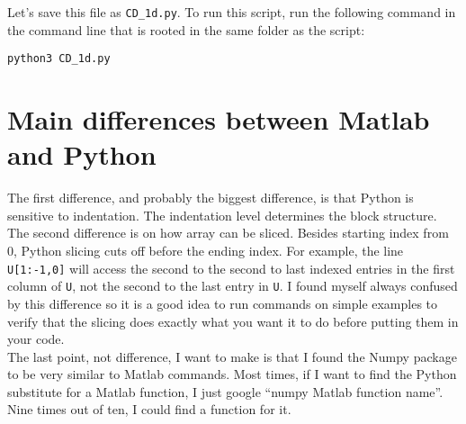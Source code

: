 \documentclass{article}
\begin{document}
Let's save this file as \texttt{CD\_1d.py}. To run this script, run the following command in the command line that is rooted in the same folder as the script:
\begin{center}
\texttt{python3 CD\_1d.py}
\end{center}

\section{Main differences between Matlab and Python}
The first difference, and probably the biggest difference, is that Python is sensitive to indentation. The indentation level determines the block structure. \\

The second difference is on how array can be sliced. Besides starting index from 0, Python slicing cuts off before the ending index. For example, the line \texttt{U[1:-1,0]} will access the second to the second to last indexed entries in the first column of \texttt{U}, not the second to the last entry in \texttt{U}. I found myself always confused by this difference so it is a good idea to run commands on simple examples to verify that the slicing does exactly what you want it to do before putting them in your code. \\

The last point, not difference, I want to make is that I found the Numpy package to be very similar to Matlab commands. Most times, if I want to find the Python substitute for a Matlab function, I just google ``numpy {Matlab function name}''. Nine times out of ten, I could find a function for it.  
\end{document}
